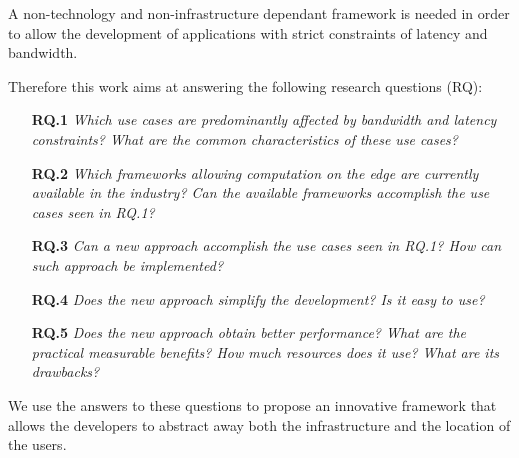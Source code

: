 A non-technology and non-infrastructure dependant framework is needed in order to allow the development of applications with strict constraints of latency and bandwidth.

Therefore this work aims at answering the following research questions (RQ):
\begin{itemize}
    \item[\textbf{RQ.1}]\emph{Which use cases are predominantly affected by bandwidth and latency constraints? What are the common characteristics of these use cases?}
    
    \item[\textbf{RQ.2}]\emph{Which frameworks allowing computation on the edge are currently available in the industry? Can the available frameworks accomplish the use cases seen in RQ.1?}
    
    \item[\textbf{RQ.3}]\emph{Can a new approach accomplish the use cases seen in RQ.1? How can such approach be implemented?}
    
    \item[\textbf{RQ.4}]\emph{Does the new approach simplify the development? Is it easy to use?}
    
    \item[\textbf{RQ.5}]\emph{Does the new approach obtain better performance? What are the practical measurable benefits? How much resources does it use? What are its drawbacks?}
\end{itemize}

We use the answers to these questions to propose an innovative framework that allows the developers to abstract away both the infrastructure and the location of the users.

